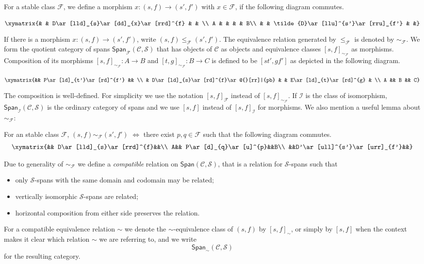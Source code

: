 \documentclass{tac}
\theoremstyle{definition}
\theoremstyle{remark}
\def\mc#1{\mathcal {#1}}
\def\C{\mc C}
\def\F{\mc F}
\def\I{\mc I}
\def\S{\mc S}
\begin{document}
For a stable class $\F$, we define a morphism $x:(s,f)\rightarrow(s',f')$ with $x\in\F$, if the following diagram commutes.
\begin{center}
	$\xymatrix{& & D\ar[lld]_{s}\ar[dd]_{x}\ar[rrd]^{f} & & \\
		A & & & & B\\
		& & \tilde{D}\ar[llu]^{s'}\ar[rru]_{f'} & &}$
\end{center}
If there is a morphism $x:(s,f)\rightarrow(s',f')$, write $(s,f)\leq_\F(s',f')$. The equivalence relation generated by $\leq_\F$ is denoted by $\sim_\F$. We form the quotient category of spans $\mathsf{Span}_\F(\C,\S)$ that has objects of $\C$ as objects and equivalence classes $[s,f]_{\sim_\F}$ as morphisms. Composition of its morphisms $[s,f]_{\sim_\F}:A\rightarrow B$ and $[t,g]_{\sim_\F}:B\rightarrow C$ is defined to be $[st',gf']$ as depicted in the following diagram.
\begin{center}
	$\xymatrix{&& P\ar[ld]_{t'}\ar[rd]^{f'} && \\
		& D\ar[ld]_{s}\ar[rd]^{f}\ar@{}[rr]|{pb} & & E\ar[ld]_{t}\ar[rd]^{g} & \\
		A && B && C}$
\end{center}
The composition is well-defined. For simplicity we use the notation $[s,f]_\F$ instead of $[s,f]_{\sim_\F}$.
If $\I$ is the class of isomorphism, $\mathsf{Span}_\I(\C,\S)$ is the ordinary category of spans and we use $[s,f]$ instead of $[s,f]_\I$ for morphisms.
We also mention a useful lemma about $\sim_\F$:
\begin{lemma}\label{describe for stab class rel}
	For an stable class $\F$, $(s,f)\sim_\F(s',f')$ $\iff$ there exist $p,q\in\F$ such that the following diagram commutes.
	$$\xymatrix{&& D\ar[lld]_{s}\ar[rrd]^{f}&&\\
	A&& P\ar[d]_{q}\ar[u]^{p}&&B\\
&&D'\ar[ull]^{s'}\ar[urr]_{f'}&&}$$
	
\end{lemma}

Due to generality of $\sim_\F$ we define a {\em compatible} relation on $\mathsf{Span}(\C,\S)$, that is a relation for $\S$-spans such that
\begin{itemize}
	\item only $\S$-spans with the same domain and codomain may be related;
	\item vertically isomorphic $\S$-spans are related;
	\item horizontal composition from either side preserves the relation.
\end{itemize}
For a compatible equivalence relation $\sim$ we denote the $\sim$-equivalence class of $(s,f)$ by $[s,f]_{\sim}$, or simply by $[s,f]$ when the context makes it clear which relation $\sim$ we are referring to, and we write
$$\mathsf{Span}_{\sim}(\C,\S)$$
for the resulting category.
\end{document}
